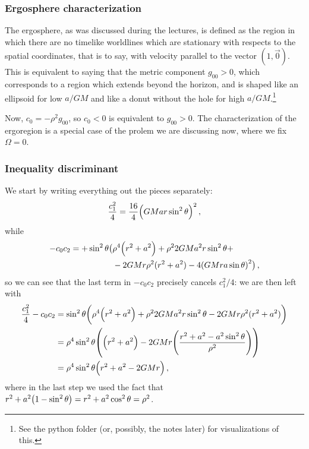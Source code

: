 \documentclass[main.tex]{subfiles}
\begin{document}
\subsubsection{Ergosphere characterization}

The ergosphere, as was discussed during the lectures, is defined as the region in which there are no timelike worldlines which are stationary with respects to the spatial coordinates, that is to say, with velocity parallel to the vector \((1, \vec{0})\).
This is equivalent to saying that the metric component \(g_{00} > 0\), which corresponds to a region which extends beyond the horizon, and is shaped like an ellipsoid for low \(a/GM\) and like a donut without the hole for high \(a/ GM\).\footnote{See the python folder (or, possibly, the notes later) for visualizations of this.}

Now, \(c_0 = - \rho^2 g_{00} \), so \(c_0 < 0\) is equivalent to \(g_{00} > 0\). 
The characterization of the ergoregion is a special case of the prolem we are discussing now, where we fix \(\Omega = 0\).

\subsubsection{Inequality discriminant}

We start by writing everything out the pieces separately: 
%
\begin{align}
  \frac{c_1^2}{4} = 
  \frac{16}{4} \qty(GMar \sin^2\theta)^2 
\,,
\end{align}
%
while
%
\begin{subequations}
\begin{align}
\begin{split}
    - c_0 c_2  = 
    + \sin^2\theta  \big(&\rho^{4} \qty(r^2+a^2) + \rho^2 2 GMa^2 r \sin^2\theta +\\
    &- 2GMr \rho^2 (r^2+a^2) - 4 \qty(GMra \sin \theta )^2\big)
    \,,
\end{split}
\end{align}
\end{subequations}
%
so we can see that the last term in \(- c_0 c_2 \) precisely cancels \(c_1 ^2 /4\): we are then left with 
%
\begin{subequations}
\begin{align}
  \frac{c_1^2}{4}-c_0 c_2 &= \sin^2 \theta \qty(\rho^{4} \qty(r^2+a^2) + \rho^2 2 GMa^2 r \sin^2\theta 
  - 2GMr \rho^2 (r^2+a^2))  \\
  &= \rho^{4} \sin^2\theta \qty(\qty(r^2+a^2) - 2GMr \qty(\frac{r^2+a^2 - a^2 \sin^2\theta }{\rho^2}))  \\
  &= \rho^{4} \sin^2\theta \qty(r^2+a^2-2GMr)
\,,
\end{align}
\end{subequations}
%
where in the last step we used the fact that \(r^2+a^2 \qty(1 - \sin^2\theta ) = r^2+a^2 \cos^2\theta = \rho^2\). 
\end{document}
